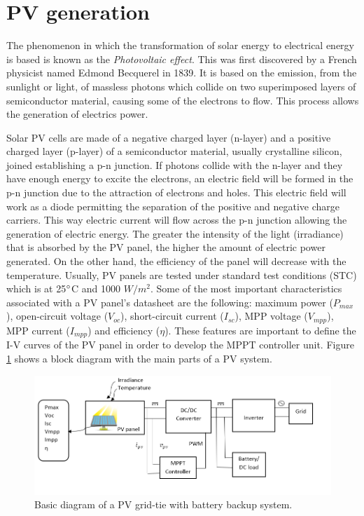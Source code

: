 \section{PV generation}

The phenomenon in which the transformation of solar energy to electrical energy is based is known as the \textit{Photovoltaic effect}. This  was first discovered by a French physicist named Edmond Becquerel in 1839. It is based on the emission, from the sunlight or light, of massless photons which collide on two superimposed layers of semiconductor material, causing some of the electrons to flow. This process allows the generation of electrics power. 

Solar PV cells are made of a negative charged layer (n-layer) and a positive charged layer (p-layer) of a semiconductor material, usually crystalline silicon, joined establishing a p-n junction. If photons collide with the n-layer and they have enough energy to excite the electrons, an electric field will be formed in the p-n junction due to the attraction of electrons and holes. This electric field will work as a diode permitting the separation of the positive and negative charge carriers. This way electric current will flow across the p-n junction allowing the generation of electric energy. %
The greater the intensity of the light (irradiance) that is absorbed by the PV panel, the higher the amount of electric power generated. On the other hand, the efficiency of the panel will decrease with the temperature. Usually, PV panels are tested under standard test conditions (STC) which is at 25$\dec$C and 1000 $W/ m^2$. %
Some of the most important characteristics associated with a PV panel’s datasheet are the following: maximum power ($P_{max}$), open-circuit voltage ($V_{oc}$), short-circuit current ($I_{sc}$), MPP voltage ($V_{mpp}$), MPP current ($I_{mpp}$) and efficiency ($\eta$).  %
These features are important to define the I-V curves of the PV panel in order to develop the MPPT controller unit. Figure \ref{fig:PVsystemblocks} shows a block diagram with the main parts of a PV system.

\begin{figure}[htbp]
	\includegraphics[width=\linewidth]{../Pictures/PV_system_blocks}
	\caption{Basic diagram of a PV grid-tie with battery backup system.}
	\label{fig:PVsystemblocks}
\end{figure}

